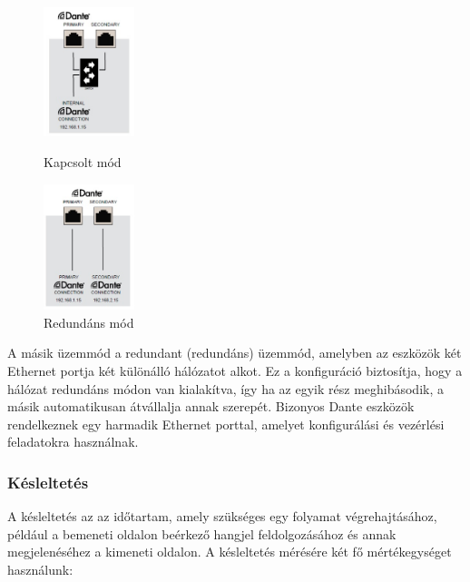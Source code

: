 \begin{figure}[H]
	\begin{minipage}{0.5\textwidth}
		\centering
		\includegraphics[width=100px, keepaspectratio]{figures/dante-switched-mode.jpg}
		\caption{Kapcsolt mód}
		\label{fig:dante_switched}
	\end{minipage}%
	\begin{minipage}{0.5\textwidth}
		\centering
		\includegraphics[width=100px, keepaspectratio]{figures/dante-redundant-mode.jpg}
		\caption{Redundáns mód}
		\label{fig:dante_redundant}
	\end{minipage}
\end{figure}

A másik üzemmód a redundant (redundáns) üzemmód, amelyben az eszközök két 
Ethernet portja két különálló hálózatot alkot. Ez a konfiguráció biztosítja, hogy 
a hálózat redundáns módon van kialakítva, így ha az egyik rész meghibásodik, 
a másik automatikusan átvállalja annak szerepét. 
Bizonyos Dante eszközök rendelkeznek egy harmadik Ethernet porttal, 
amelyet konfigurálási és vezérlési feladatokra használnak.

\subsubsection{Késleltetés}
A késleltetés az az időtartam, amely szükséges egy folyamat végrehajtásához, 
például a bemeneti oldalon beérkező hangjel feldolgozásához és annak megjelenéséhez 
a kimeneti oldalon. A késleltetés mérésére két fő mértékegységet használunk:

